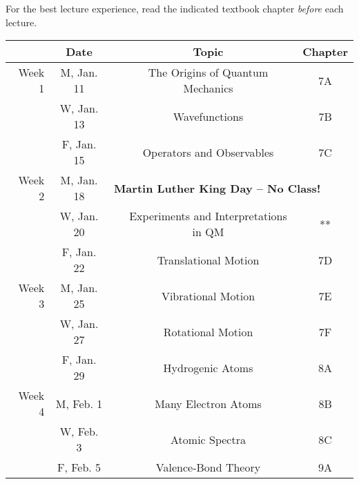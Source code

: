 \documentclass[12pt, letterpaper]{article}
\begin{document}
\noindent For the best lecture experience, read the indicated textbook chapter \emph{before} each lecture. 

\noindent
\begin{tabular}{rcccc}
	& Date && Topic & Chapter\\
	\midrule
	Week 1 & M, Jan. 11&& The Origins of Quantum Mechanics & 7A\\
	& W, Jan. 13&& Wavefunctions & 7B\\
	& F, Jan. 15&& Operators and Observables & 7C\\
	\midrule
	Week 2 & M, Jan. 18& \multicolumn{3}{l}{\textbf{Martin Luther King Day -- No Class!}}\\
	& W, Jan. 20&& Experiments and Interpretations in QM & **\\
	& F, Jan. 22&& Translational Motion & 7D\\
	\midrule
	Week 3 & M, Jan. 25&& Vibrational Motion & 7E\\
	& W, Jan. 27&& Rotational Motion & 7F\\
	& F, Jan. 29&& Hydrogenic Atoms & 8A\\
	\midrule
	Week 4 & M, Feb. 1&& Many Electron Atoms & 8B\\
	& W, Feb. 3&& Atomic Spectra & 8C\\
	& F, Feb. 5&& Valence-Bond Theory & 9A\\
\end{tabular}
\end{document}
